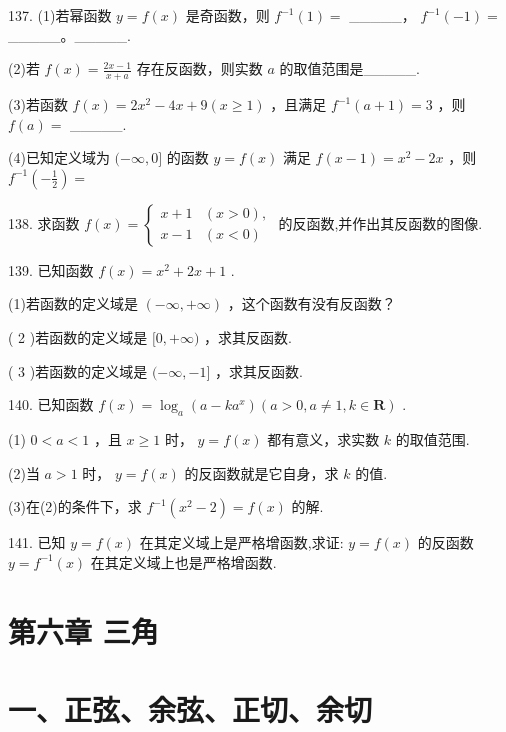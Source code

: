 \documentclass[10pt]{article}
\begin{document}
137. (1)若幂函数 \(y = f\left( x\right)\) 是奇函数，则 \({f}^{-1}\left( 1\right)  =\) \_\_\_\_\_， \({f}^{-1}\left( {-1}\right)  =\) \_\_\_\_\_。\_\_\_\_\_.

(2)若 \(f\left( x\right)  = \frac{{2x} - 1}{x + a}\) 存在反函数，则实数 \(a\) 的取值范围是\_\_\_\_\_.

(3)若函数 \(f\left( x\right)  = 2{x}^{2} - {4x} + 9\left( {x \geq  1}\right)\) ，且满足 \({f}^{-1}\left( {a + 1}\right)  = 3\) ，则 \(f\left( a\right)  =\) \_\_\_\_\_.

(4)已知定义域为 \(( - \infty ,0\rbrack\) 的函数 \(y = f\left( x\right)\) 满足 \(f\left( {x - 1}\right)  = {x}^{2} - {2x}\) ，则 \({f}^{-1}\left( {-\frac{1}{2}}\right)  =\)

138. 求函数 \(f\left( x\right)  = \left\{  \begin{array}{ll} x + 1 & \left( {x > 0}\right) , \\  x - 1 & \left( {x < 0}\right)  \end{array}\right.\) 的反函数,并作出其反函数的图像.

139. 已知函数 \(f\left( x\right)  = {x}^{2} + {2x} + 1\) .

(1)若函数的定义域是 \(\left( {-\infty , + \infty }\right)\) ，这个函数有没有反函数？

( 2 )若函数的定义域是 \(\lbrack 0, + \infty )\) ，求其反函数.

( 3 )若函数的定义域是 \(( - \infty , - 1\rbrack\) ，求其反函数.

140. 已知函数 \(f\left( x\right)  = {\log }_{a}\left( {a - k{a}^{x}}\right) \left( {a > 0,a \neq  1,k \in  \mathbf{R}}\right)\) .

(1) \(0 < a < 1\) ，且 \(x \geq  1\) 时， \(y = f\left( x\right)\) 都有意义，求实数 \(k\) 的取值范围.

(2)当 \(a > 1\) 时， \(y = f\left( x\right)\) 的反函数就是它自身，求 \(k\) 的值.

(3)在(2)的条件下，求 \({f}^{-1}\left( {{x}^{2} - 2}\right)  = f\left( x\right)\) 的解.

141. 已知 \(y = f\left( x\right)\) 在其定义域上是严格增函数,求证: \(y = f\left( x\right)\) 的反函数 \(y = {f}^{-1}\left( x\right)\) 在其定义域上也是严格增函数.

\section*{第六章 三角}

\section*{一、正弦、余弦、正切、余切}
\end{document}
